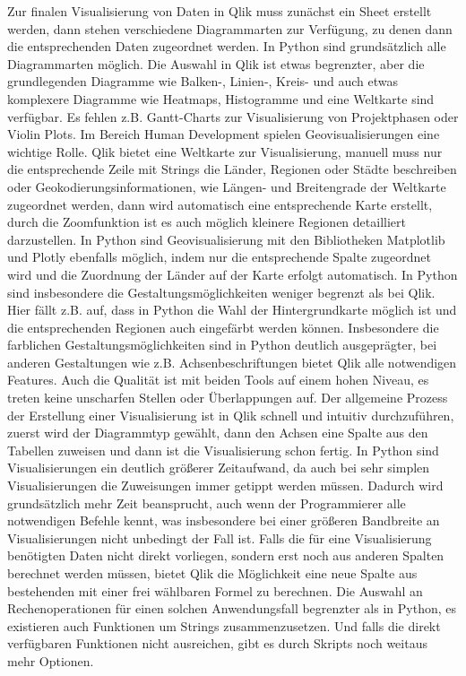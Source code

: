 \documentclass[12pt]{article}
\begin{document}
	Zur finalen Visualisierung von Daten in Qlik muss zunächst ein Sheet erstellt werden, dann stehen verschiedene Diagrammarten zur Verfügung, zu denen dann die entsprechenden Daten zugeordnet werden.
	In Python sind grundsätzlich alle Diagrammarten möglich. Die Auswahl in Qlik ist etwas begrenzter, aber die grundlegenden Diagramme wie Balken-, Linien-, Kreis- und auch etwas komplexere Diagramme wie Heatmaps, Histogramme und eine Weltkarte sind verfügbar. Es fehlen z.B. Gantt-Charts zur Visualisierung von Projektphasen oder Violin Plots.
	Im Bereich Human Development spielen Geovisualisierungen eine wichtige Rolle. Qlik bietet eine Weltkarte zur Visualisierung, manuell muss nur die entsprechende Zeile mit Strings die Länder, Regionen oder Städte beschreiben oder Geokodierungsinformationen, wie Längen- und Breitengrade der Weltkarte zugeordnet werden, dann wird automatisch eine entsprechende Karte erstellt, durch die Zoomfunktion ist es auch möglich kleinere Regionen detailliert darzustellen. In Python sind Geovisualisierung mit den Bibliotheken Matplotlib und Plotly ebenfalls möglich, indem nur die entsprechende Spalte zugeordnet wird und die Zuordnung der Länder auf der Karte erfolgt automatisch. In Python sind insbesondere die Gestaltungsmöglichkeiten weniger begrenzt als bei Qlik. Hier fällt z.B. auf, dass in Python die Wahl der Hintergrundkarte möglich ist und die entsprechenden Regionen auch eingefärbt werden können.
	Insbesondere die farblichen Gestaltungsmöglichkeiten sind in Python deutlich ausgeprägter, bei anderen Gestaltungen wie z.B. Achsenbeschriftungen bietet Qlik alle notwendigen Features. Auch die Qualität ist mit beiden Tools auf einem hohen Niveau, es treten keine unscharfen Stellen oder Überlappungen auf. Der allgemeine Prozess der Erstellung einer Visualisierung ist in Qlik schnell und intuitiv durchzuführen, zuerst wird der Diagrammtyp gewählt, dann den Achsen eine Spalte aus den Tabellen zuweisen und dann ist die Visualisierung schon fertig. In Python sind Visualisierungen ein deutlich größerer Zeitaufwand, da auch bei sehr simplen Visualisierungen die Zuweisungen immer getippt werden müssen. Dadurch wird grundsätzlich mehr Zeit beansprucht, auch wenn der Programmierer alle notwendigen Befehle kennt, was insbesondere bei einer größeren Bandbreite an Visualisierungen nicht unbedingt der Fall ist. Falls die für eine Visualisierung benötigten Daten nicht direkt vorliegen, sondern erst noch aus anderen Spalten berechnet werden müssen, bietet Qlik die Möglichkeit eine neue Spalte aus bestehenden mit einer frei wählbaren Formel zu berechnen. Die Auswahl an Rechenoperationen für einen solchen Anwendungsfall begrenzter als in Python, es existieren auch Funktionen um Strings zusammenzusetzen. Und falls die direkt verfügbaren Funktionen nicht ausreichen, gibt es durch Skripts noch weitaus mehr Optionen.
\end{document}
